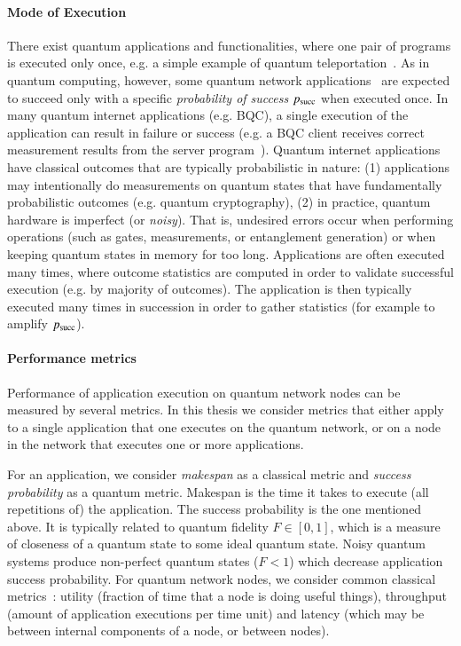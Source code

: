 \paragraph{Mode of Execution}
There exist quantum applications and functionalities, where one pair of programs is executed only once, e.g. a simple example of quantum teleportation~\cite{bennett_1993_teleportation}.
As in quantum computing, however, some quantum network applications~\cite{wehner_2018_stages} are expected to succeed only with a specific \emph{probability of success} $p_{\rm succ}$ when executed once.
In many quantum internet applications (e.g. BQC), a single execution of the application can result in failure or success (e.g. a BQC client receives correct measurement results from the server program~\cite{leichtle2021verifying}).
Quantum internet applications have classical outcomes that are typically probabilistic in nature:
(1) applications may intentionally do measurements on quantum states that have fundamentally probabilistic outcomes (e.g. quantum cryptography),
(2) in practice, quantum hardware is imperfect (or \textit{noisy}). That is, undesired errors occur
when performing operations (such as gates, measurements, or entanglement generation) or when keeping quantum states in memory for too long.
Applications are often executed many times, where outcome statistics are computed in order to validate successful execution (e.g. by majority of outcomes).
The application is then typically executed many times in succession in order to gather statistics (for example to amplify $p_{\rm succ}$).


\paragraph{Performance metrics}
Performance of application execution on quantum network nodes can be measured by several metrics.
In this thesis we consider metrics that either apply to a single application that one executes on the quantum network, or on a node in the network that executes one or more applications.

For an application, we consider \textit{makespan} as a classical metric and \textit{success probability} as a quantum metric.
Makespan is the time it takes to execute (all repetitions of) the application.
The success probability is the one mentioned above.
It is typically related to quantum fidelity $F \in [0, 1]$, which is a measure of closeness of a quantum state to some ideal quantum state.
Noisy quantum systems produce non-perfect quantum states ($F < 1$) which decrease application success probability.
For quantum network nodes, we consider common classical metrics~\cite{stankiewicz_commag}: utility (fraction of time that a node is doing useful things), throughput (amount of application executions per time unit) and latency (which may be between internal components of a node, or between nodes).




\begin{xstretch}
\printbibliography[heading=subbibintoc,title={References},notcategory=noprint]
\end{xstretch}
